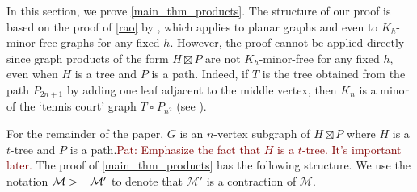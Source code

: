 \documentclass{patmorin}
\renewcommand{\ge}{\geqslant}
\newcommand{\pat}[1]{\textcolor{Maroon}{Pat: #1}}
\newcommand{\defin}[1]{\emph{\textcolor{brightmaroon}{#1}}}
\DeclareMathOperator{\diam}{diam}
\begin{document}
%
%
%


In this section, we prove \cref{main_thm_products}.  The structure of our proof is based on the proof of \cref{rao} by \citet{rao:small}, which applies to planar graphs and even to $K_{h}$-minor-free graphs for any fixed $h$.  However, the proof cannot be applied directly since graph products of the form $H\boxtimes P$ are not $K_h$-minor-free for any fixed $h$, even when $H$ is a tree and $P$ is a path. Indeed, if $T$ is the tree obtained from the path $P_{2n+1}$ by adding one leaf adjacent to the middle vertex, then $K_n$ is a minor of the `tennis court' graph $T\mathbin{\square} P_{n^2}$ (see  \citep{Wood-NYJM11}).

For the remainder of the paper, $G$ is an $n$-vertex subgraph of $H\boxtimes P$ where $H$ is a $t$-tree and $P$ is a path.\pat{Emphasize the fact that $H$ is a $t$-tree. It's important later.}  The proof of \cref{main_thm_products} has the following structure. We use the notation $\mathcal{M}\rightbroom\mathcal{M'}$ to denote that $\mathcal{M}'$ is a contraction of $\mathcal{M}$.
\end{document}
